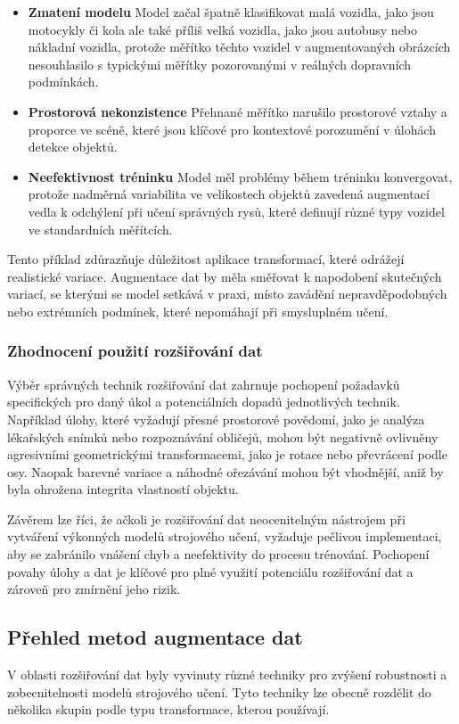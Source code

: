 \documentclass[male,czech,api_ing]{thesis}
\begin{document}
\begin{itemize}
    \item \textbf{Zmatení modelu} Model začal špatně klasifikovat malá vozidla, jako jsou motocykly či kola ale také příliš velká vozidla, jako jsou autobusy nebo nákladní vozidla, protože měřítko těchto vozidel v augmentovaných obrázcích nesouhlasilo s typickými měřítky pozorovanými v reálných dopravních podmínkách. 
    \item \textbf{Prostorová nekonzistence} Přehnané měřítko narušilo prostorové vztahy a proporce ve scéně, které jsou klíčové pro kontextové porozumění v úlohách detekce objektů.
    \item \textbf{Neefektivnost tréninku} Model měl problémy během tréninku konvergovat, protože nadměrná variabilita ve velikostech objektů zavedená augmentací vedla k odchýlení při učení správných rysů, které definují různé typy vozidel ve standardních měřítcích. 
\end{itemize}

Tento příklad zdůrazňuje důležitost aplikace transformací, které odrážejí realistické variace. Augmentace dat by měla směřovat k napodobení skutečných variací, se kterými se model setkává v praxi, místo zavádění nepravděpodobných nebo extrémních podmínek, které nepomáhají při smysluplném učení. \cite{AugmentationBasics, AugmentationSurvey}

\subsubsection{Zhodnocení použití rozšiřování dat}
Výběr správných technik rozšiřování dat zahrnuje pochopení požadavků specifických pro daný úkol a potenciálních dopadů jednotlivých technik. Například úlohy, které vyžadují přesné prostorové povědomí, jako je analýza lékařských snímků nebo rozpoznávání obličejů, mohou být negativně ovlivněny agresivními geometrickými transformacemi, jako je rotace nebo převrácení podle osy. Naopak barevné variace a náhodné ořezávání mohou být vhodnější, aniž by byla ohrožena integrita vlastností objektu.

Závěrem lze říci, že ačkoli je rozšiřování dat neocenitelným nástrojem při vytváření výkonných modelů strojového učení, vyžaduje pečlivou implementaci, aby se zabránilo vnášení chyb a neefektivity do procesu trénování. Pochopení povahy úlohy a dat je klíčové pro plné využití potenciálu rozšiřování dat a zároveň pro zmírnění jeho rizik.

\subsection{Přehled metod augmentace dat}
V oblasti rozšiřování dat byly vyvinuty různé techniky pro zvýšení robustnosti a zobecnitelnosti modelů strojového učení. Tyto techniky lze obecně rozdělit do několika skupin podle typu transformace, kterou používají.
\end{document}
